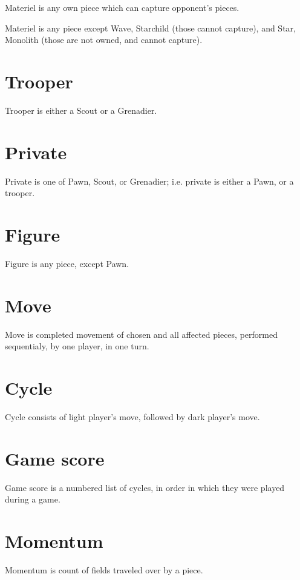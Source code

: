 Materiel is any own piece which can capture opponent's pieces.

Materiel is any piece except Wave, Starchild (those cannot capture),
and Star, Monolith (those are not owned, and cannot capture).

\section*{Trooper}
\label{sec:Terms/Trooper}
Trooper is either a Scout or a Grenadier.

\section*{Private}
\label{sec:Terms/Private}
Private is one of Pawn, Scout, or Grenadier; i.e. private is either a Pawn,
or a trooper.

\section*{Figure}
\label{sec:Terms/Figure}
Figure is any piece, except Pawn.

\section*{Move}
\label{sec:Terms/Move}
Move is completed movement of chosen and all affected pieces, performed
sequentialy, by one player, in one turn.

\section*{Cycle}
\label{sec:Terms/Cycle}
Cycle consists of light player's move, followed by dark player's move.

\section*{Game score}
\label{sec:Terms/Game score}
Game score is a numbered list of cycles, in order in which they were played
during a game.

\section*{Momentum}
\label{sec:Terms/Momentum}
Momentum is count of fields traveled over by a piece.

